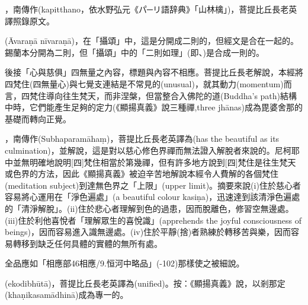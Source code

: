 \startitemgroup[noteitems]
\item{}，南傳作(kapitthano，依水野弘元《パ─リ語辞典》「山林檎」)，菩提比丘長老英譯照錄原文。
\stopitemgroup

\startitemgroup[noteitems]
\item{}(Āvaraṇā nīvaraṇā)，在「攝頌」中，這是分開成二則的，但經文是合在一起的。錫蘭本分開為二則，但「攝頌」中的「二則如理」(即、)是合成一則的。
\stopitemgroup

\startitemgroup[noteitems]
\item{}後接「心與慈俱」四無量之內容，標題與內容不相應。菩提比丘長老解說，本經將四梵住(四無量心)與七覺支連結是不常見的(unusual)，就其動力(momentum)而言，四梵住導向往生梵天，而非涅槃，但當整合入佛陀的道(Buddha's path)結構中時，它們能產生足夠的定力(《顯揚真義》說三種禪,three jhānas)成為毘婆舍那的基礎而轉向正覺。
\stopitemgroup

\startitemgroup[noteitems]
\item{}，南傳作(Subhaparamāhaṃ)，菩提比丘長老英譯為(has the beautiful as its culmination)，並解說，這是對以慈心修色界禪而無法證入解脫者來說的。尼柯耶中並無明確地說明[四]梵住相當於第幾禪，但有許多地方說到[四]梵住是往生梵天或色界的方法，因此《顯揚真義》被迫辛苦地解說本經令人費解的各個梵住(meditation subject)到達無色界之「上限」(upper limit)。摘要來說(i)住於慈心者容易將心運用在「淨色遍處」(a beautiful colour kasiṇa)，迅速達到該清淨色遍處的「清淨解脫」。(ii)住於悲心者理解到色的過患，因而脫離色，修習空無邊處。(iii)住於利他喜悅者「理解眾生的喜悅識」(apprehends the joyful consciousness of beings)，因而容易進入識無邊處。(iv)住於平靜(捨)者熟練於轉移苦與樂，因而容易轉移到缺乏任何具體的實體的無所有處。
\stopitemgroup

\startitemgroup[noteitems]
\item{}全品應如「相應部46相應/9.恒河中略品」(-102)那樣使之被細說。
\stopitemgroup

\startitemgroup[noteitems]
\item{}(ekodibhūtā)，菩提比丘長老英譯為(unified)。按：《顯揚真義》說，以剎那定(khaṇikasamādhinā)成為專一的。
\stopitemgroup

